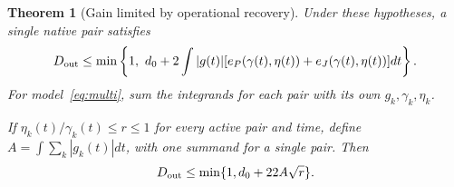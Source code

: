 \documentclass[11pt]{article}
\newtheorem{theorem}{Theorem}
\begin{document}
\begin{theorem}[Gain limited by operational recovery]\label{thm:gain}
Under these hypotheses, a single native pair satisfies
\begin{equation}
 D_{\rm out}\leq\min\left\{1,\ d_0+
 2\int |g(t)|[e_P(\gamma(t),\eta(t))+e_J(\gamma(t),\eta(t))]dt\right\}.\label{eq:gain}
\end{equation}
For model~\eqref{eq:multi}, sum the integrands for each pair with its own $g_k,\gamma_k,\eta_k$.

If $\eta_k(t)/\gamma_k(t)\leq r\leq1$ for every active pair and time, define $A=\int\sum_k|g_k(t)|dt$, with one summand for a single pair. Then
\begin{equation}
 D_{\rm out}\leq\min\{1,d_0+22A\sqrt r\}.\label{eq:simple}
\end{equation}
\end{theorem}
\end{document}
